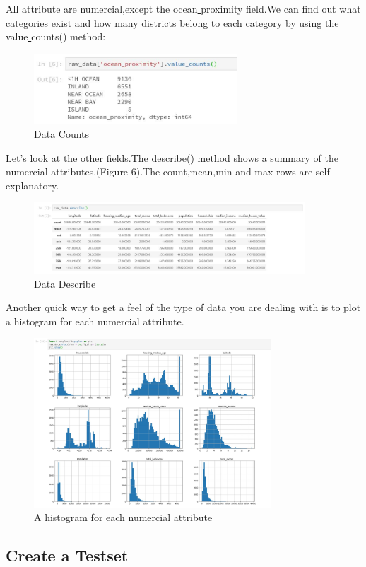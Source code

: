 \documentclass[UTF8]{ctexart}
\begin{document}
All attribute are numercial,except the ocean\underline{ }proximity field.We can find out what categories exist and how many districts belong to each category by using the value\underline{ }counts() method:

\begin{figure}[H]
\centering
\includegraphics[width = 3in]{datacounts.JPG}
\caption{Data Counts}
\end{figure}

Let's look at the other fields.The describe() method shows a summary of the numercial attributes.(Figure 6).The count,mean,min and max rows are self-explanatory.

\begin{figure}[H]
\centering
\includegraphics[width = 4in]{DATADESCRIBE.JPG}
\caption{Data Describe}
\end{figure}

Another quick way to get a feel of the type of data you are dealing with is to plot a histogram for each numercial attribute.

\begin{figure}[H]
\centering
\includegraphics[width = 3.5in]{datahist.JPG}
\caption{A histogram for each numercial attribute}
\end{figure}

\subsection{Create a Testset}
\end{document}

